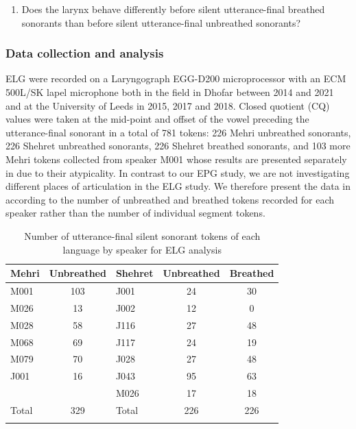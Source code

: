 \documentclass[output=paper]{langscibook}
\begin{document}
\begin{enumerate}
  \item[3.] Does the larynx behave differently before silent utterance-final breathed sonorants than before silent utterance-final unbreathed sonorants?
\end{enumerate}

\subsubsection{Data collection and analysis} %
\label{sec:watson:4.4.1}
ELG were recorded on a Laryngograph EGG-D200 microprocessor with an ECM 500L/SK lapel microphone both in the field in Dhofar between 2014 and 2021 and at the University of Leeds in 2015, 2017 and 2018. Closed quotient (CQ) values were taken at the mid-point and offset of the vowel preceding the utterance-final sonorant in a total of 781 tokens: 226 Mehri unbreathed sonorants, 226 Shehret unbreathed sonorants, 226 Shehret breathed sonorants, and 103 more Mehri tokens collected from speaker M001 whose results are presented separately in  due to their atypicality. In contrast to our EPG study, we are not investigating different places of articulation in the ELG study. We therefore present the data in  according to the number of unbreathed and breathed tokens recorded for each speaker rather than the number of individual segment tokens.

\begin{table}
\caption{Number of utterance-final silent sonorant tokens of each language by speaker for ELG analysis}
\label{tab:watson:10}
\begin{tabular}{lS[table-format=3.0] l S[table-format=3.0] S[table-format=3.0]}
\lsptoprule
 {Mehri} & {Unbreathed} & {Shehret} & {Unbreathed} & {Breathed}\\
 \midrule
 M001 & 103& J001 & 24 & 30\\
 M026 & 13 & J002 & 12 & 0\\
 M028 & 58 & J116 & 27 & 48\\
 M068 & 69 & J117 & 24 & 19\\
 M079 & 70 & J028 & 27 & 48\\
 J001 & 16 & J043 & 95 & 63\\
      &    & M026 & 17 & 18\\
\midrule
 Total & {329} & Total & {226} & {226}\\
\lspbottomrule
\end{tabular}
\end{table}
\end{document}
